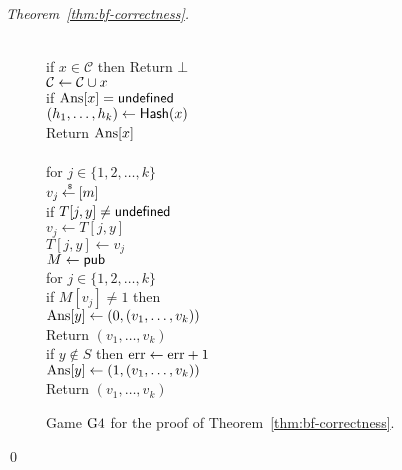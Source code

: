 \begin{proof}[Theorem~\ref{thm:bf-correctness}]
\begin{figure}[tp]
{{\\
if $x \in \mathcal{C}$ then Return $\bot$\\
${\cal C} \gets {\cal C} \cup x$\\
if $\mathrm{Ans}[x] = \mathsf{undefined}$\\
\nudge $(h_1, \ldots, h_{k}) \gets \mathsf{Hash}(x)$\\
Return $\mathrm{Ans}[x]$\\
%
}
{
\\
for $j \in \{1,2,\ldots,k\}$\\
\nudge $v_j {\:\stackrel{{\scriptscriptstyle \hspace{0.2em}\$}} {\leftarrow}\:} [m]$\\
\nudge if $T[j,y] \neq \mathsf{undefined}$\\
\nudge \nudge $v_j \gets T[j,y]$\\
\nudge $T[j,y] \gets v_j$\\
%
$M \gets{\sf pub}$\\
for $j \in \{1,2,\ldots,k\}$\\
\nudge if $M[v_j] \neq 1$ then \\
\nudge \nudge $\mathrm{Ans}[y] \gets (0, (v_1, \ldots, v_{k}) )$\\
\nudge \nudge Return $\left(v_1,\ldots,v_k\right)$\\
if $y \not\in S$ then $\mathrm{err} \gets \mathrm{err} +1$\\
$\mathrm{Ans}[y] \gets (1, (v_1, \ldots, v_{k}))$\\
Return $\left(v_1,\ldots,v_k\right)$
}
}
\caption{Game $\text{G4}$ for the
proof of Theorem~\ref{thm:bf-correctness}.}
\label{fig:bf-correctness-games2}
\end{figure}
\hfill\qed
\end{proof}

